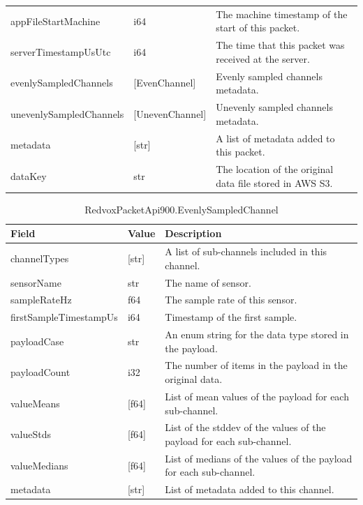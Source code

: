 \begin{table}
\begin{tabularx}{\textwidth}{llX}
		appFileStartMachine & i64 & The machine timestamp of the start of this packet. \\
		serverTimestampUsUtc & i64 & The time that this packet was received at the server. \\
		evenlySampledChannels & [EvenChannel] & Evenly sampled channels metadata. \\
		unevenlySampledChannels& [UnevenChannel] & Unevenly sampled channels metadata. \\
		metadata & [str] & A list of metadata added to this packet. \\
		dataKey & str & The location of the original data file stored in AWS S3. \\
		\bottomrule
	\end{tabularx}
	\label{table:RedvoxPacketApi900}
\end{table}

\begin{table}[H]
	\centering
	\caption{RedvoxPacketApi900.EvenlySampledChannel}
	\begin{tabularx}{\textwidth}{llX}
		\toprule
		\textbf{Field} & \textbf{Value} & \textbf{Description} \\
		\midrule
		channelTypes & [str] & A list of sub-channels included in this channel. \\
		sensorName & str & The name of sensor. \\
		sampleRateHz & f64 & The sample rate of this sensor. \\
		firstSampleTimestampUs & i64 & Timestamp of the first sample. \\
		payloadCase & str & An enum string for the data type stored in the payload. \\
		payloadCount & i32 & The number of items in the payload in the original data. \\
		valueMeans & [f64] & List of mean values of the payload for each sub-channel. \\
		valueStds & [f64] & List of the stddev of the values of the payload for each sub-channel. \\
		valueMedians & [f64] & List of medians of the values of the payload for each sub-channel. \\
		metadata & [str] & List of metadata added to this channel. \\
		\bottomrule
	\end{tabularx}
	\label{table:EvenlySampledChannel}
\end{table}

